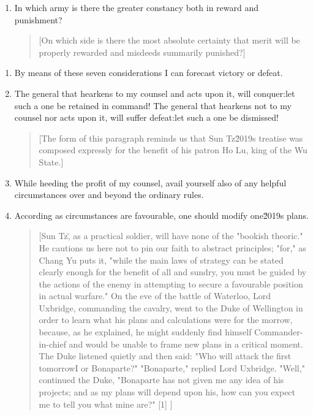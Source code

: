 \documentclass[10pt,a4paper]{book}
\begin{document}
\begin{enumerate}[leftmargin=*, label=\arabic*.,wide=0pt, resume]
\begin{enumerate}[label=(\arabic*), leftmargin=2em, wide=0pt]
\item In which army is there the greater constancy both in reward and punishment?

{\small
\begin{quote}
[On which side is there the most absolute certainty that merit will be properly rewarded and misdeeds summarily punished?]
\end{quote}
}

\end{enumerate}

\end{enumerate}

\begin{enumerate}[leftmargin=*, label=\arabic*.,wide=0pt, resume]

\item By means of these seven considerations I can forecast victory or defeat.

\item The general that hearkens to my counsel and acts upon it, will conquer:\textemdash let such a one be retained in command! The general that hearkens not to my counsel nor acts upon it, will suffer defeat:\textemdash let such a one be dismissed!

{\small
\begin{quote}
[The form of this paragraph reminds us that Sun Tz\u2019s treatise was composed expressly for the benefit of his patron Ho Lu, king of the Wu State.]
\end{quote}
}

\item While heeding the profit of my counsel, avail yourself also of any helpful circumstances over and beyond the ordinary rules.

\item According as circumstances are favourable, one should modify one\u2019s plans.

{\small
\begin{quote}
[Sun Tz\u, as a practical soldier, will have none of the "bookish theoric." He cautions us here not to pin our faith to abstract principles; "for," as Chang Yu puts it, "while the main laws of strategy can be stated clearly enough for the benefit of all and sundry, you must be guided by the actions of the enemy in attempting to secure a favourable position in actual warfare." On the eve of the battle of Waterloo, Lord Uxbridge, commanding the cavalry, went to the Duke of Wellington in order to learn what his plans and calculations were for the morrow, because, as he explained, he might suddenly find himself Commander-in-chief and would be unable to frame new plans in a critical moment. The Duke listened quietly and then said: "Who will attack the first tomorrow\textemdash I or Bonaparte?" "Bonaparte," replied Lord Uxbridge. "Well," continued the Duke, "Bonaparte has not given me any idea of his projects; and as my plans will depend upon his, how can you expect me to tell you what mine are?" [1] ]
\end{quote}
}


\end{enumerate}
\end{document}
